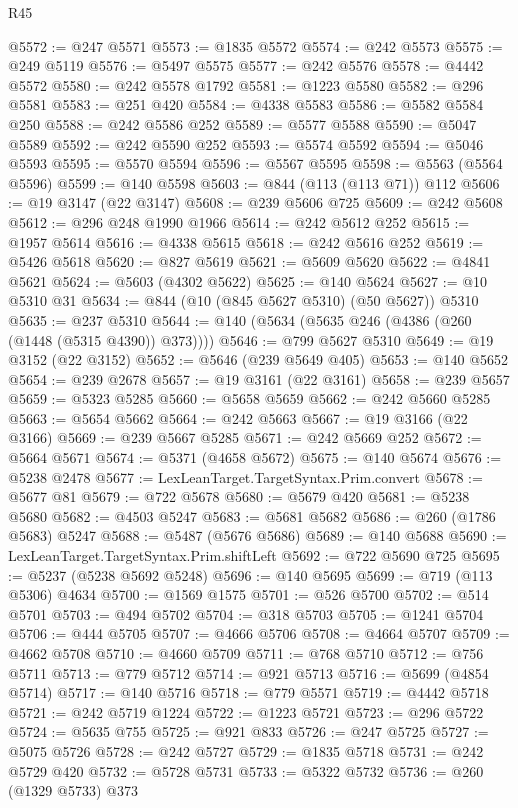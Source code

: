 \begin{lexlean}{R45}
\begin{coremodule}
{@5572 := @247 @5571
@5573 := @1835 @5572
@5574 := @242 @5573
@5575 := @249 @5119
@5576 := @5497 @5575
@5577 := @242 @5576
@5578 := @4442 @5572
@5580 := @242 @5578 @1792
@5581 := @1223 @5580
@5582 := @296 @5581
@5583 := @251 @420
@5584 := @4338 @5583
@5586 := @5582 @5584 @250
@5588 := @242 @5586 @252
@5589 := @5577 @5588
@5590 := @5047 @5589
@5592 := @242 @5590 @252
@5593 := @5574 @5592
@5594 := @5046 @5593
@5595 := @5570 @5594
@5596 := @5567 @5595
@5598 := @5563 (@5564 @5596)
@5599 := @140 @5598
@5603 := @844 (@113 (@113 @71)) @112
@5606 := @19 @3147 (@22 @3147)
@5608 := @239 @5606 @725
@5609 := @242 @5608
@5612 := @296 @248 @1990 @1966
@5614 := @242 @5612 @252
@5615 := @1957 @5614
@5616 := @4338 @5615
@5618 := @242 @5616 @252
@5619 := @5426 @5618
@5620 := @827 @5619
@5621 := @5609 @5620
@5622 := @4841 @5621
@5624 := @5603 (@4302 @5622)
@5625 := @140 @5624
@5627 := @10 @5310 @31
@5634 := @844 (@10 (@845 @5627 @5310) (@50 @5627)) @5310
@5635 := @237 @5310
@5644 := @140 (@5634 (@5635 @246 (@4386 (@260 (@1448 (@5315 @4390)) @373))))
@5646 := @799 @5627 @5310
@5649 := @19 @3152 (@22 @3152)
@5652 := @5646 (@239 @5649 @405)
@5653 := @140 @5652
@5654 := @239 @2678
@5657 := @19 @3161 (@22 @3161)
@5658 := @239 @5657
@5659 := @5323 @5285
@5660 := @5658 @5659
@5662 := @242 @5660 @5285
@5663 := @5654 @5662
@5664 := @242 @5663
@5667 := @19 @3166 (@22 @3166)
@5669 := @239 @5667 @5285
@5671 := @242 @5669 @252
@5672 := @5664 @5671
@5674 := @5371 (@4658 @5672)
@5675 := @140 @5674
@5676 := @5238 @2478
@5677 := LexLeanTarget.TargetSyntax.Prim.convert
@5678 := @5677 @81
@5679 := @722 @5678
@5680 := @5679 @420
@5681 := @5238 @5680
@5682 := @4503 @5247
@5683 := @5681 @5682
@5686 := @260 (@1786 @5683) @5247
@5688 := @5487 (@5676 @5686)
@5689 := @140 @5688
@5690 := LexLeanTarget.TargetSyntax.Prim.shiftLeft
@5692 := @722 @5690 @725
@5695 := @5237 (@5238 @5692 @5248)
@5696 := @140 @5695
@5699 := @719 (@113 @5306) @4634
@5700 := @1569 @1575
@5701 := @526 @5700
@5702 := @514 @5701
@5703 := @494 @5702
@5704 := @318 @5703
@5705 := @1241 @5704
@5706 := @444 @5705
@5707 := @4666 @5706
@5708 := @4664 @5707
@5709 := @4662 @5708
@5710 := @4660 @5709
@5711 := @768 @5710
@5712 := @756 @5711
@5713 := @779 @5712
@5714 := @921 @5713
@5716 := @5699 (@4854 @5714)
@5717 := @140 @5716
@5718 := @779 @5571
@5719 := @4442 @5718
@5721 := @242 @5719 @1224
@5722 := @1223 @5721
@5723 := @296 @5722
@5724 := @5635 @755
@5725 := @921 @833
@5726 := @247 @5725
@5727 := @5075 @5726
@5728 := @242 @5727
@5729 := @1835 @5718
@5731 := @242 @5729 @420
@5732 := @5728 @5731
@5733 := @5322 @5732
@5736 := @260 (@1329 @5733) @373
}
\end{coremodule}
\end{lexlean}
